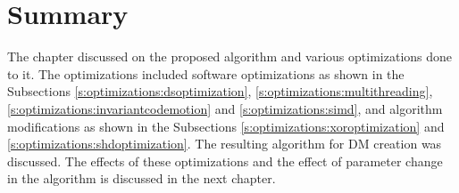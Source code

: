 \section{Summary}
\label{sec:summary3}

The chapter discussed on the proposed algorithm and various optimizations done to it. The optimizations included software optimizations as shown in the Subsections \ref{s:optimizations:dsoptimization}, \ref{s:optimizations:multithreading}, \ref{s:optimizations:invariantcodemotion} and \ref{s:optimizations:simd}, and algorithm modifications as shown in the Subsections \ref{s:optimizations:xoroptimization} and \ref{s:optimizations:shdoptimization}. The resulting algorithm for DM creation was discussed. The effects of these optimizations and the effect of parameter change in the algorithm is discussed in the next chapter.
